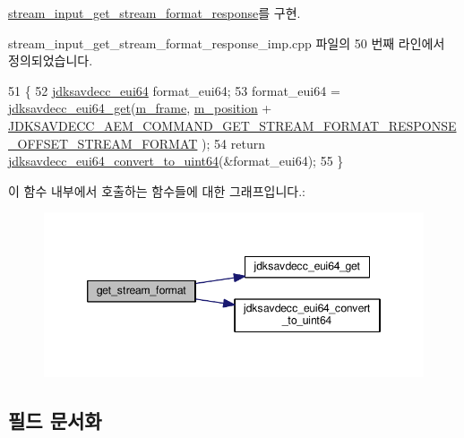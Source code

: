 \hyperlink{classavdecc__lib_1_1stream__input__get__stream__format__response_aba7b3a3a06d9c53ef54e43787fa46a7a}{stream\+\_\+input\+\_\+get\+\_\+stream\+\_\+format\+\_\+response}를 구현.



stream\+\_\+input\+\_\+get\+\_\+stream\+\_\+format\+\_\+response\+\_\+imp.\+cpp 파일의 50 번째 라인에서 정의되었습니다.


\begin{DoxyCode}
51 \{
52     \hyperlink{structjdksavdecc__eui64}{jdksavdecc\_eui64} format\_eui64;
53     format\_eui64 = \hyperlink{group__eui64_ga2652311a25a6b91cddbed75c108c7031}{jdksavdecc\_eui64\_get}(\hyperlink{classavdecc__lib_1_1stream__input__get__stream__format__response__imp_a50417969cf438e7c8d698726bbbe2ff9}{m\_frame}, 
      \hyperlink{classavdecc__lib_1_1stream__input__get__stream__format__response__imp_af5e691c4a8a0feb07f48440b321206cd}{m\_position} + 
      \hyperlink{group__command__get__stream__format__response_ga7c39f9ec657a6331b5b12a126dc02a1e}{JDKSAVDECC\_AEM\_COMMAND\_GET\_STREAM\_FORMAT\_RESPONSE\_OFFSET\_STREAM\_FORMAT}
      );
54     \textcolor{keywordflow}{return} \hyperlink{group__eui64_ga1c9a3634faa4bec90dea5a52e691bf63}{jdksavdecc\_eui64\_convert\_to\_uint64}(&format\_eui64);
55 \}
\end{DoxyCode}


이 함수 내부에서 호출하는 함수들에 대한 그래프입니다.\+:
\nopagebreak
\begin{figure}[H]
\begin{center}
\leavevmode
\includegraphics[width=346pt]{classavdecc__lib_1_1stream__input__get__stream__format__response__imp_a853524daa61b51c7cba18fbb01bc078e_cgraph}
\end{center}
\end{figure}




\subsection{필드 문서화}
